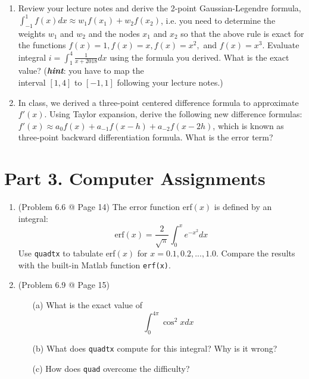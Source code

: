 \documentclass[10pt]{report}
\newcommand{\dintt}[4] {\int_{#1}^{#2} #3 d#4}
\begin{document}
\begin{enumerate}
	\item 
	Review your lecture notes and derive the 2-point Gaussian-Legendre formula, $\dintt{-1}{1}{f(x)}{x} \approx w_1 f(x_1) + w_2 f(x_2)$, i.e. you need to determine the weights $w_1$ and $w_2$ and the nodes $x_1$ and $x_2$ so that the above rule is exact for the functions $f(x)=1, f(x)=x, f(x)=x^2,$ and $f(x)=x^3$. Evaluate integral $i = \dintt{1}{4}{\frac{1}{x+2018}}{x}$ using the formula you derived. What is the exact value? (\textit{\textbf{hint}}: you have to map the\\[0.5 ex]
	interval $[1, 4]$ to $[-1,1]$ following your lecture notes.)
	
	\item 
	In class, we derived a three-point centered difference formula to approximate $f'(x)$. Using Taylor expansion, derive the following new difference formulas: $f'(x)\approx a_0 f(x) + a_{-1}f(x-h) + a_{-2}f(x-2h)$, which is known as three-point backward differentiation formula. What is the error term?
\end{enumerate}

\section*{Part 3. Computer Assignments}
\begin{enumerate}
	\item 
	(Problem 6.6 @ Page 14)  The error function erf$(x)$ is defined by an integral:
	\[
	\text{erf}(x) = \frac{2}{\sqrt{\pi}} \dintt{0}{x}{e^{-x^2}}{x}
	\]
	Use \texttt{quadtx} to tabulate erf$(x)$ for $x = 0.1, 0.2, . . . , 1.0$. Compare the results with the built-in Matlab function \texttt{erf(x)}.
	
	\item 
	(Problem 6.9 @ Page 15)
	\begin{enumerate}
		\item [(a)]
		What is the exact value of
		\[
		\dintt{0}{4\pi}{\cos^2 x}{x}
		\]
		
		\item [(b)]
		What does \texttt{quadtx} compute for this integral? Why is it wrong?
		
		\item [(c)]
		How does \texttt{quad} overcome the difficulty?
	\end{enumerate}
\end{enumerate}
\end{document}
